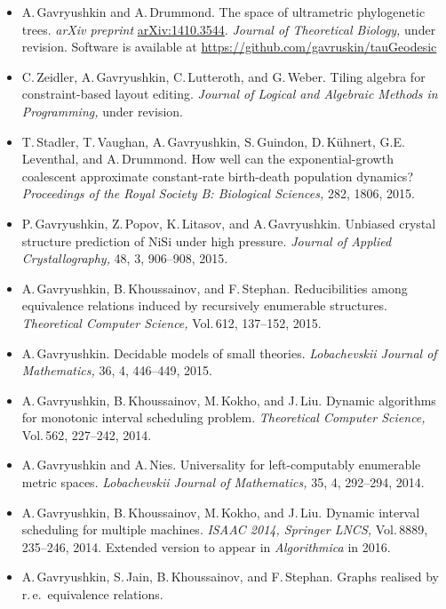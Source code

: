 \documentclass[12pt]{article}
\begin{document}
\iftoggle{full}{
\centerline{\bf Publications}
}{
\newpage
\centerline{\bf Recent publications}
}
\begin{itemize}
\item A.\,Gavryushkin and A.\,Drummond.
	The space of ultrametric phylogenetic trees.
	{\em arXiv preprint} \href{http://arxiv.org/abs/1410.3544}{arXiv:1410.3544}.
	{\em Journal of Theoretical Biology,} under revision.
	Software is available at
	\href{https://github.com/gavruskin/tauGeodesic}{https://github.com/gavruskin/tauGeodesic}
\item C.\,Zeidler, A.\,Gavryushkin, C.\,Lutteroth, and G.\,Weber.
	Tiling algebra for constraint-based layout editing.
	{\em Journal of Logical and Algebraic Methods in Programming,} under revision.
\item T.\,Stadler, T.\,Vaughan, A.\,Gavryushkin, S.\,Guindon, D.\,K\"uhnert, G.E.\,Leventhal, and A.\,Drummond.
	How well can the exponential-growth coalescent approximate constant-rate birth-death population dynamics?
	{\em Proceedings of the Royal Society B: Biological Sciences,} 282, 1806, 2015.
\item P.\,Gavryushkin, Z.\,Popov, K.\,Litasov, and A.\,Gavryushkin.
	Unbiased crystal structure prediction of $\mathrm{NiSi}$ under high pressure.
	{\em Journal of Applied Crystallography,} 48, 3, 906--908, 2015.
\item A.\,Gavryushkin, B.\,Khoussainov, and F.\,Stephan.
	Reducibilities among equivalence relations induced by recursively enumerable structures.
	{\em Theoretical Computer Science,} Vol.\,612, 137--152, 2015.
\item A.\,Gavryushkin.
	Decidable models of small theories.
	{\em Lobachevskii Journal of Mathematics,} 36, 4, 446--449, 2015.
\item A.\,Gavryushkin, B.\,Khoussainov, M.\,Kokho, and J.\,Liu.
	Dynamic algorithms for monotonic interval scheduling problem.
	{\em Theoretical Computer Science,} Vol.\,562, 227--242, 2014.
\item A.\,Gavryushkin and A.\,Nies.
	Universality for left-computably enumerable metric spaces.
	{\em Lobachevskii Journal of Mathematics,} 35, 4, 292--294, 2014.
\item A.\,Gavryushkin, B.\,Khoussainov, M.\,Kokho, and J.\,Liu.
	Dynamic interval scheduling for multiple machines.
	{\em ISAAC 2014, Springer LNCS,} Vol.\,8889, 235--246, 2014.
	Extended version to appear in {\em Algorithmica} in 2016.
\item A.\,Gavryushkin, S.\,Jain, B.\,Khoussainov, and F.\,Stephan.
	Graphs realised by r.\,e.\ equivalence relations.

\end{itemize}
\end{document}
